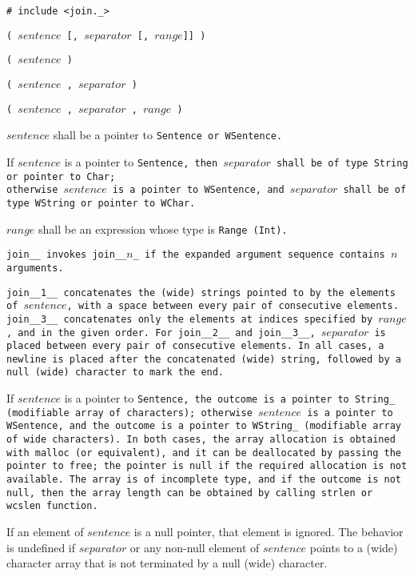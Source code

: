 
\tt{# include <join._>}

\s\s\s\s\tt{(} $sentence$
[\tt{,} $separator$ [\tt{,} $range$]] \tt{)}

\s\tt{(} $sentence$ \tt{)}

\s\tt{(} $sentence$
\phantom{[}\tt{,} $separator$\phantom{]} \tt{)}

\s\tt{(} $sentence$
\phantom{[}\tt{,} $separator$ \phantom{[}\tt{,} $range$\phantom{]]} \tt{)}


$sentence$ shall be a pointer to \tt{Sentence} or \tt{WSentence}.

If $sentence$ is a pointer to \tt{Sentence}, then $separator$
shall be of type \tt{String} or pointer to \tt{Char};\\
otherwise $sentence$ is a pointer to \tt{WSentence}, and
$separator$ shall be of type \tt{WString} or pointer to \tt{WChar}.

$range$ shall be an expression whose type is \tt{Range (Int)}.


\tt{join__} invokes \tt{join__}$n$\_ if the
expanded argument sequence contains $n$ arguments.

\tt{join__1__} concatenates the (wide) strings pointed to by the elements
of $sentence$, with a space between every pair of consecutive elements.
\tt{join__3__} concatenates only the elements at
indices specified by $range$, and in the given order.
For \tt{join__2__} and \tt{join__3__}, $separator$
is placed between every pair of consecutive elements.
In all cases, a newline is placed after the concatenated (wide)
string, followed by a null (wide) character to mark the end.

If $sentence$ is a pointer to \tt{Sentence}, the outcome is a pointer to
\tt{String_} (modifiable array of characters); otherwise $sentence$ is a
pointer to \tt{WSentence}, and the outcome is a pointer to \tt{WString_}
(modifiable array of wide characters).
In both cases, the array allocation is obtained with \tt{malloc} (or equivalent),
and it can be deallocated by passing the pointer to  \tt{free};
the pointer is null if the required allocation is not available.
The array is of incomplete type, and if the outcome is not null, then the
array length can be obtained by calling \tt{strlen} or \tt{wcslen} function.

If an element of $sentence$ is a null pointer, that element is ignored.
The behavior is undefined if $separator$ or any non-null element of $sentence$
points to a (wide) character array that is not terminated by a null (wide) character.

